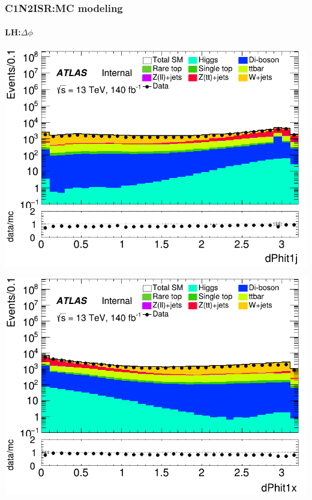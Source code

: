 \documentclass[usenames,dvipsnames]{beamer}
\begin{document}
\begin{frame}
\frametitle{C1N2ISR:MC modeling}
\framesubtitle{LH:\quad $\Delta\phi$}
    \begin{minipage}{0.32\textwidth}
        \centering
        \includegraphics[width=\textwidth]{graphics/LH_met/LH_met_dPhit1j.png}
    \end{minipage}
    \hfill
    \begin{minipage}{0.32\textwidth}
        \centering
        \includegraphics[width=\textwidth]{graphics/LH_met/LH_met_dPhit1x.png}
    \end{minipage}
    \hfill
    \begin{minipage}{0.32\textwidth}
        \centering

\end{minipage}
\end{frame}
\end{document}
